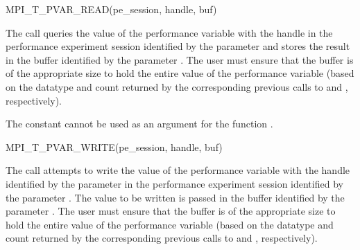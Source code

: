 \begin{funcdef}{MPI\_T\_PVAR\_READ}{(\mbox{pe\_session}, \mbox{handle}, \mbox{buf})}
\end{funcdef}

The  call queries the value of the performance
variable with the handle  in the performance experiment session identified by the
parameter  and stores the result in the buffer identified
by the parameter .  The user must ensure that the
buffer is of the appropriate size to hold the entire value of the
performance variable (based on the datatype and count returned by the
corresponding previous calls to  and
, respectively).

The constant  cannot be used as an
argument for the function .

\begin{funcdef}{MPI\_T\_PVAR\_WRITE}{(\mbox{pe\_session}, \mbox{handle}, \mbox{buf})}
\end{funcdef}

The  call attempts to write the value of the
performance variable with the handle identified by the parameter
 in the performance experiment session identified by the parameter
.  The value to be written is passed in the buffer
identified by the parameter .  The user must ensure that the
buffer is of the appropriate size to hold the entire value of the
performance variable (based on the datatype and count returned by the
corresponding previous calls to  and
, respectively).


